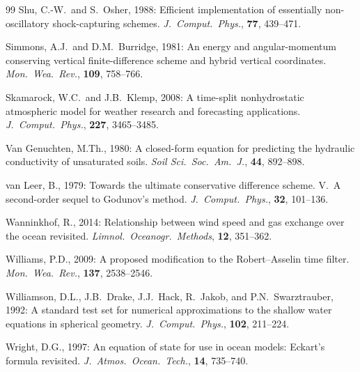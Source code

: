 \documentclass[11pt,twoside]{report}
\begin{document}
\begin{thebibliography}{99}
Shu, C.-W.\ and S.~Osher, 1988:
Efficient implementation of essentially non-oscillatory shock-capturing
schemes.
\textit{J.\ Comput.\ Phys.}, \textbf{77}, 439--471.

Simmons, A.J.\ and D.M.~Burridge, 1981:
An energy and angular-momentum conserving vertical finite-difference
scheme and hybrid vertical coordinates.
\textit{Mon.\ Wea.\ Rev.}, \textbf{109}, 758--766.

Skamarock, W.C.\ and J.B.~Klemp, 2008:
A time-split nonhydrostatic atmospheric model for weather research and
forecasting applications.
\textit{J.\ Comput.\ Phys.}, \textbf{227}, 3465--3485.

Van Genuchten, M.Th., 1980:
A closed-form equation for predicting the hydraulic conductivity of
unsaturated soils.
\textit{Soil Sci.\ Soc.\ Am.\ J.}, \textbf{44}, 892--898.

van Leer, B., 1979:
Towards the ultimate conservative difference scheme. V.\ A second-order
sequel to Godunov's method.
\textit{J.\ Comput.\ Phys.}, \textbf{32}, 101--136.

Wanninkhof, R., 2014:
Relationship between wind speed and gas exchange over the ocean revisited.
\textit{Limnol.\ Oceanogr.\ Methods}, \textbf{12}, 351--362.

Williams, P.D., 2009:
A proposed modification to the Robert--Asselin time filter.
\textit{Mon.\ Wea.\ Rev.}, \textbf{137}, 2538--2546.

Williamson, D.L., J.B.~Drake, J.J.~Hack, R.~Jakob, and P.N.~Swarztrauber, 1992:
A standard test set for numerical approximations to the shallow water
equations in spherical geometry.
\textit{J.\ Comput.\ Phys.}, \textbf{102}, 211--224.

Wright, D.G., 1997:
An equation of state for use in ocean models: Eckart's formula revisited.
\textit{J.\ Atmos.\ Ocean.\ Tech.}, \textbf{14}, 735--740.



\end{thebibliography}
\end{document}

